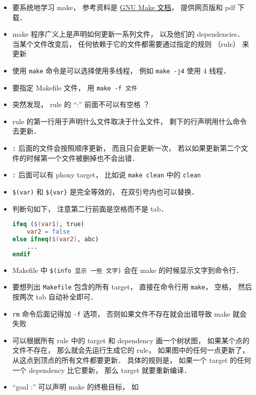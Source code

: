 


\begin{itemize}
\item 要系统地学习 make， 参考资料是 \href{https://www.gnu.org/software/make/manual/}{GNU Make 文档}， 提供网页版和 pdf 下载．
\item make 程序广义上是声明如何更新一系列文件， 以及他们的 dependencies． 当某个文件改变后， 任何依赖于它的文件都需要通过指定的规则 （rule） 来更新
\item 使用 \verb|make| 命令是可以选择使用多线程， 例如 \verb|make -j4| 使用 4 线程．
\item 要指定 Makefile 文件， 用 \verb|make -f 文件|
\item 突然发现， rule 的 “:” 前面不可以有空格 ？
\item rule 的第一行用于声明什么文件取决于什么文件， 剩下的行声明用什么命令去更新．
\item \verb|:| 后面的文件会按照顺序更新， 而且只会更新一次， 若以如果更新第二个文件的时候第一个文件被删掉也不会出错．
\item \verb|:| 后面可以有 phony target， 比如说 \verb|make clean| 中的 \verb|clean|
\item \verb|$(var)| 和 \verb|${var}| 是完全等效的， 在双引号内也可以替换．
\item 判断句如下， 注意第二行前面是空格而不是 tab．
\begin{lstlisting}[language=makefile]
ifeq ($(var1), true)
    var2 = false
else ifneq($(var2), abc)
    ...
endif
\end{lstlisting}
\item Makefile 中 \verb|$(info 显示 一些 文字)| 会在 make 的时候显示文字到命令行．
\item 要想列出 \verb|Makefile| 包含的所有 target， 直接在命令行用 \verb|make|， 空格， 然后按两次 tab 自动补全即可．
\item \verb|rm| 命令后面记得加 \verb|-f| 选项， 否则如果文件不存在就会出错导致 make 就会失败
\item 可以根据所有 rule 中的 target 和 dependency 画一个树状图， 如果某个点的文件不存在， 那么就会先运行生成它的 rule， 如果图中的任何一点更新了， 从这点到顶点的所有文件都要更新． 具体的规则是， 如果一个 target 的任何一个 dependency 比它要新， 那么 target 就要重新编译．
\item “goal :” 可以声明 make 的终极目标， 如

\end{itemize}
